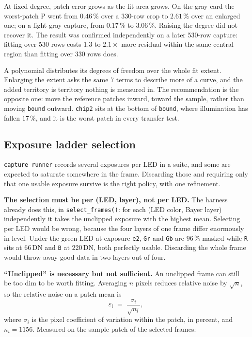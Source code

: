 \documentclass[11pt, a4paper]{article}
\newcommand{\code}[1]{\texttt{#1}}
\newcommand{\pct}{\,\%}
\begin{document}
At fixed degree, patch error grows as the fit area grows.
On the gray card the worst-patch P went from $0.46\pct$
over a 330-row crop to $2.61\pct$ over an enlarged one;
on a light-gray capture, from $0.17\pct$ to $3.06\pct$.
Raising the degree did not recover it.
The result was confirmed independently on a later 530-row capture:
fitting over 530 rows costs $1.3$ to $2.1\times$ more residual
within the same central region
than fitting over 330 rows does.

A polynomial distributes its degrees of freedom
over the whole fit extent.
Enlarging the extent asks the same 7 terms to describe more of a curve,
and the added territory is territory nothing is measured in.
The recommendation is the opposite one:
move the reference patches inward, toward the sample,
rather than moving \code{bound} outward.
\code{chip2} sits at the bottom of \code{bound},
where illumination has fallen $17\pct$,
and it is the worst patch in every transfer test.

\subsection{Exposure ladder selection}
\label{sec:ladderselect}

\code{capture\_runner} records several exposures per LED in a suite,
and some are expected to saturate somewhere in the frame.
Discarding those and requiring only that one usable exposure survive
is the right policy,
with one refinement.

\textbf{The selection must be per (LED, layer), not per LED.}
The harness already does this,
in \code{select\_frames()}:
for each (LED color, Bayer layer) independently
it takes the unclipped exposure with the highest mean.
Selecting per LED would be wrong,
because the four layers of one frame differ enormously in level.
Under the green LED at exposure \code{e2},
\code{Gr} and \code{Gb} are $96\pct$ masked
while \code{R} sits at 66\,DN and \code{B} at 220\,DN,
both perfectly usable.
Discarding the whole frame would throw away good data
in two layers out of four.

\textbf{``Unclipped'' is necessary but not sufficient.}
An unclipped frame can still be too dim to be worth fitting.
Averaging $n$ pixels reduces relative noise by $\sqrt{n}$,
so the relative noise on a patch mean is
\begin{equation}
  \varepsilon_i \;=\; \frac{\sigma_i}{\sqrt{n_i}} ,
  \label{eq:patchnoise}
\end{equation}
where $\sigma_i$ is the pixel coefficient of variation within the patch,
in percent, and $n_i = 1156$.
Measured on the sample patch of the selected frames:
\end{document}

